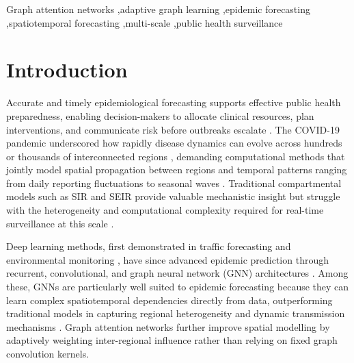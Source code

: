 \documentclass[final,1p,times]{elsarticle}
\begin{document}
\begin{frontmatter}

\begin{keyword}
  Graph attention networks \sep adaptive graph learning \sep epidemic forecasting \sep spatiotemporal forecasting \sep multi-scale \sep public health surveillance
\end{keyword}

\end{frontmatter}

\section{Introduction}
\label{sec:introduction}

Accurate and timely epidemiological forecasting supports effective public health preparedness, enabling decision-makers to allocate clinical resources, plan interventions, and communicate risk before outbreaks escalate \cite{DEANGELIS201583, Brooks2018Nonmechanistic}. The COVID-19 pandemic underscored how rapidly disease dynamics can evolve across hundreds or thousands of interconnected regions \cite{ajao2023deep, da2021covid, giuliani2020modelling, verma2022temporal, ma2024reporting}, demanding computational methods that jointly model spatial propagation between regions and temporal patterns ranging from daily reporting fluctuations to seasonal waves \cite{Panja2022Epicasting, Stone2007Seasonal}. Traditional compartmental models such as SIR and SEIR provide valuable mechanistic insight but struggle with the heterogeneity and computational complexity required for real-time surveillance at this scale \cite{heltberg2022spatial, s25082507, DEANGELIS201583}.

Deep learning methods, first demonstrated in traffic forecasting \cite{li2017diffusion, zhang2021graph} and environmental monitoring \cite{wu2018deep, lai2018modeling}, have since advanced epidemic prediction through recurrent, convolutional, and graph neural network (GNN) architectures \cite{ajao2023deep, zhiweidingBiologyInformedRecurrentNeural2023, Ahmadini2025, Kamalov2022ReviewDL, wang2019defsi}. Among these, GNNs are particularly well suited to epidemic forecasting because they can learn complex spatiotemporal dependencies directly from data, outperforming traditional models in capturing regional heterogeneity and dynamic transmission mechanisms \cite{kimForecastingEpidemicSpread2025, lijingwangCausalGNNCausalBasedGraph2022, gao2021stan}. Graph attention networks \cite{velickovic2017graph} further improve spatial modelling by adaptively weighting inter-regional influence rather than relying on fixed graph convolution kernels.
\end{document}

